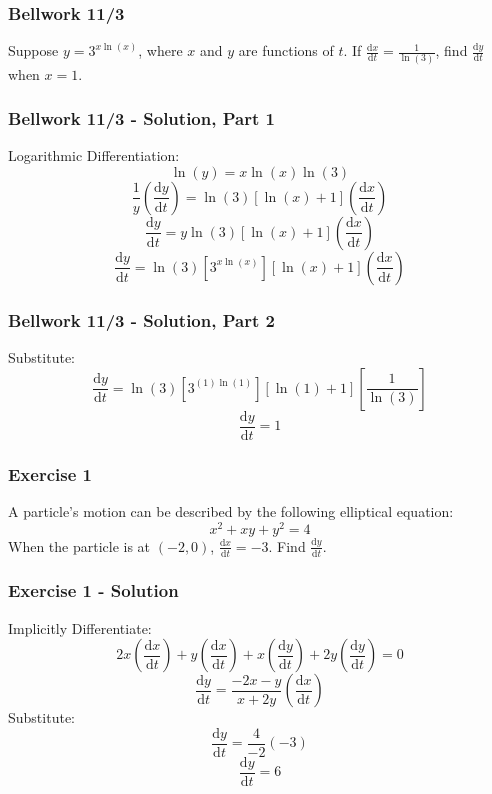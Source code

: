 \documentclass[12pt]{beamer}
\begin{document}
\begin{frame}
	\frametitle{Bellwork 11/3}
	\initclock

	\vfill
	\vfill
	\vfill
	\vfill
	\Large
	Suppose $y=3^{x\ln(x)}$, where $x$ and $y$ are functions of $t$.
	\vfill
	\vfill
	If $\frac{\mathrm{d}x}{\mathrm{d}t} = \frac{1}{\ln(3)}$, find $\frac{\mathrm{d}y}{\mathrm{d}t}$ when $x=1$.
	\vfill
	\vfill
	\vfill
	\vfill
	\vfill
	\vfill
	\vfill

	\small
	\crono
\end{frame}
\begin{frame}
	\frametitle{Bellwork 11/3 - Solution, Part 1}

	\large
	Logarithmic Differentiation:
	\[\ln(y)=x\ln(x)\ln(3)\]
	\[\frac{1}{y}\left(\frac{\mathrm{d}y}{\mathrm{d}t}\right)=\ln(3)[\ln(x)+1]\left(\frac{\mathrm{d}x}{\mathrm{d}t}\right)\]
	\[\frac{\mathrm{d}y}{\mathrm{d}t}=y\ln(3)[\ln(x)+1]\left(\frac{\mathrm{d}x}{\mathrm{d}t}\right)\]
	\[\frac{\mathrm{d}y}{\mathrm{d}t}=\ln(3)\left[3^{x\ln(x)}\right][\ln(x)+1]\left(\frac{\mathrm{d}x}{\mathrm{d}t}\right)\]
\end{frame}
\begin{frame}
	\frametitle{Bellwork 11/3 - Solution, Part 2}

	\large
	Substitute:
	\[\frac{\mathrm{d}y}{\mathrm{d}t}=\ln(3)\left[3^{(1)\ln(1)}\right][\ln(1)+1]\left[\frac{1}{\ln(3)}\right]\]
	\[\boxed{\frac{\mathrm{d}y}{\mathrm{d}t}=1}\]
\end{frame}
\begin{frame}
	\frametitle{Exercise 1}

	\vfill
	\vfill
	\vfill
	\Large
	A particle's motion can be described by the following elliptical equation: \[x^2+xy+y^2=4\]
	When the particle is at $(-2,0)$, $\frac{\mathrm{d}x}{\mathrm{d}t}=-3$.
	\vfill
	Find $\frac{\mathrm{d}y}{\mathrm{d}t}$.
	\vfill
	\vfill
	\vfill
\end{frame}
\begin{frame}
	\frametitle{Exercise 1 - Solution}

	\large
	Implicitly Differentiate:
	\[2x\left(\frac{\mathrm{d}x}{\mathrm{d}t}\right)+y\left(\frac{\mathrm{d}x}{\mathrm{d}t}\right)+x\left(\frac{\mathrm{d}y}{\mathrm{d}t}\right)+2y\left(\frac{\mathrm{d}y}{\mathrm{d}t}\right)=0\]
	\[\frac{\mathrm{d}y}{\mathrm{d}t}=\frac{-2x-y}{x+2y}\left(\frac{\mathrm{d}x}{\mathrm{d}t}\right)\]
	Substitute:
	\[\frac{\mathrm{d}y}{\mathrm{d}t}=\frac{4}{-2}(-3)\]
	\[\boxed{\frac{\mathrm{d}y}{\mathrm{d}t}=6}\]
\end{frame}
\end{document}
